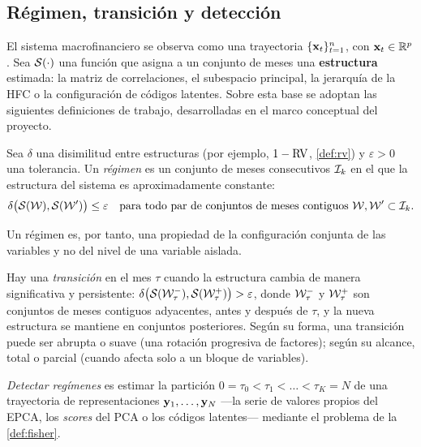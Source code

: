 \subsection{Régimen, transición y detección}
\label{sec:regimen}

El sistema macrofinanciero se observa como una trayectoria $\{\mathbf{x}_t\}_{t=1}^{n}$, con
$\mathbf{x}_t\in\mathbb{R}^{p}$. Sea $\mathcal{S}(\cdot)$ una función que asigna a un conjunto de meses una
\textbf{estructura} estimada: la matriz de correlaciones, el subespacio principal, la jerarquía de
la HFC o la configuración de códigos latentes. Sobre esta base se adoptan las siguientes
definiciones de trabajo, desarrolladas en el marco conceptual del proyecto.

\begin{definicion}[Régimen]\label{def:regimen}
Sea $\delta$ una disimilitud entre estructuras (por ejemplo, $1-\operatorname{RV}$, \cref{def:rv}) y
$\varepsilon>0$ una tolerancia. Un \emph{régimen} es un conjunto de meses consecutivos
$\mathcal{I}_k$ en el que la estructura del sistema es aproximadamente constante:
\begin{equation}\label{eq:regimen}
  \delta\bigl(\mathcal{S}(\mathcal{W}),\mathcal{S}(\mathcal{W}')\bigr)\le\varepsilon
  \quad\text{para todo par de conjuntos de meses contiguos } \mathcal{W},\mathcal{W}'\subset\mathcal{I}_k .
\end{equation}
\end{definicion}

Un régimen es, por tanto, una propiedad de la configuración conjunta de las variables y no del
nivel de una variable aislada.

\begin{definicion}[Transición]\label{def:transicion}
Hay una \emph{transición} en el mes $\tau$ cuando la estructura cambia de manera significativa y
persistente: $\delta\bigl(\mathcal{S}(\mathcal{W}_\tau^{-}),\mathcal{S}(\mathcal{W}_\tau^{+})\bigr)>\varepsilon$, donde
$\mathcal{W}_\tau^{-}$ y $\mathcal{W}_\tau^{+}$ son conjuntos de meses contiguos adyacentes, antes y después de
$\tau$, y la nueva estructura se mantiene en conjuntos posteriores. Según su forma, una
transición puede ser abrupta o suave (una rotación progresiva de factores); según su alcance,
total o parcial (cuando afecta solo a un bloque de variables).
\end{definicion}

\begin{definicion}[Detección]\label{def:deteccion}
\emph{Detectar regímenes} es estimar la partición $0=\tau_0<\tau_1<\dots<\tau_K=N$ de una
trayectoria de representaciones $\mathbf{y}_1,\dots,\mathbf{y}_N$ ---la serie de valores propios del EPCA, los
\emph{scores} del PCA o los códigos latentes--- mediante el problema de la \cref{def:fisher}.
\end{definicion}

